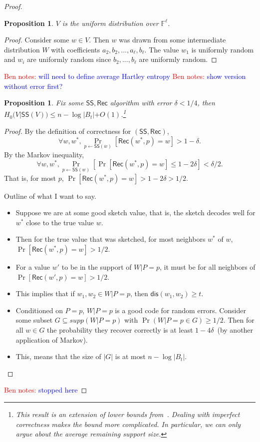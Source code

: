 \documentclass[11pt]{article}
\newcommand{\class}[1]{{\ensuremath{\mathsf{#1}}}}
\newcommand{\sketch}{\ensuremath{\class{SS}}\xspace}
\newcommand{\rec}{\ensuremath{\class{Rec}}\xspace}
\newcommand{\dis}{\ensuremath{\mathsf{dis}}}
\newtheorem{proposition}[theorem]{Proposition}
\newcommand{\authnote}[2]{{\textcolor{red}{\textsf{#1 notes: }\textcolor{blue}{ #2}}\marginpar{\textcolor{red}{\textbf{!!!!!}}}}}
\newcommand{\authnote}[2]{}
\newcommand{\bnote}[1]{{\authnote{Ben}{#1}}}
\begin{document}
\begin{proof}
\begin{proposition}$V$ is the uniform distribution over $\mathbb{F}^\ell$.
\end{proposition}
\begin{proof}
Consider some $w\in V$.  Then $w$ was drawn from some intermediate distribution $W$ with coefficients $a_2, b_2, ..., a_\ell , b_\ell$.  The value $w_1$ is uniformly random and $w_i$ are uniformly random since $b_2,..., b_\ell$ are uniformly random.
\end{proof}
\bnote{will need to define average Hartley entropy}
\bnote{show version without error first?}
\begin{proposition}
Fix some $\sketch, \rec$ algorithm with error $\delta < 1/4$, then $H_0(V | \sketch(V)) \le n - \log |B_t|+ O(1)$.\footnote{This result is an extension of lower bounds from~\cite[Appendix C]{DBLP:journals/siamcomp/DodisORS08}.  Dealing with imperfect correctness makes the bound more complicated.  In particular, we can only argue about the average remaining support size.}
\end{proposition}
\begin{proof}
By the definition of correctness for $(\sketch, \rec)$, 
\[
\forall w, w^*, \Pr_{p\leftarrow \sketch(w)} [\rec(w^*, p) = w] >1-\delta.
\]
By the Markov inequality, 
\[
\forall w, w^*, \Pr_{p \leftarrow \sketch(w)} [ \Pr[\rec(w^*, p) = w] \le 1-2\delta ] < \delta /2.
\]
That is, for most $p$, $\Pr[\rec(w^*, p) = w] > 1-2\delta>1/2$.

Outline of what I want to say.
\begin{itemize}
\item Suppose we are at some good sketch value, that is, the sketch decodes well for $w^*$ close to the true value $w$.
\item Then for the true value that was sketched, for most neighbors $w^*$ of $w$, $\Pr[\rec(w^*, p) =w] >1/2$.  
\item For a value $w'$ to be in the support of $W | P=p$, it must be for all neighbors of $\Pr[\rec( w', p) =w ]>1/2$.
\item This implies that if $w_1, w_2 \in W|P = p$, then $\dis (w_1, w_2)\ge t$.
\item Conditioned on $P=p$, $W| P=p$ is a good code for random errors.
Consider some subset $G\subseteq supp(W| P=p)$ with $\Pr (W| P=p \in G)\ge 1/2$.  Then for all $w\in G$ the probability they recover correctly is at least $1-4\delta$~(by another application of Markov).  
\item This, means that the size of $|G|$ is at most $n -\log |B_t|$.
\end{itemize}
\end{proof}

\bnote{stopped here}
\end{proof}
\end{document}
